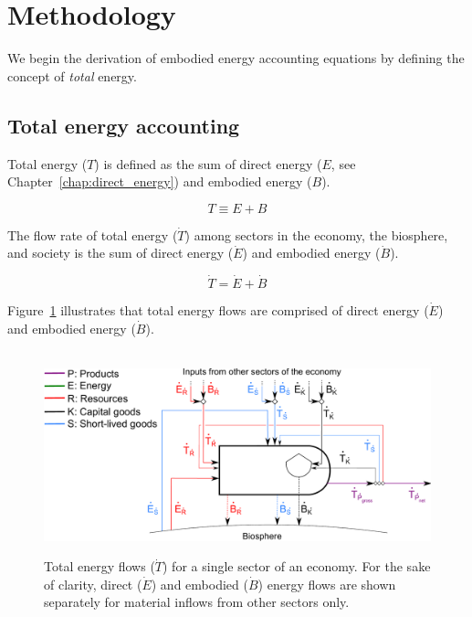 \section{Methodology}
\label{sec:embodied_methodology}

We begin the derivation of embodied energy accounting
equations by defining the concept of 
\emph{total} energy. 


\subsection{Total energy accounting}
\label{sec:total_energy_accounting}

Total energy ($T$)
is defined as the sum of 
direct energy
($E$, see Chapter~\ref{chap:direct_energy}) 
and embodied energy ($B$).

\begin{equation} \label{eq:T_def}
	T \equiv E + B
\end{equation}

The flow rate of total energy 
($\dot{T}$) among sectors in 
the economy, the biosphere, and society is the sum of
direct energy ($\dot{E}$) and embodied 
energy ($\dot{B}$).

\begin{equation} \label{eq:T_dot_def}
	\dot{T} = \dot{E} + \dot{B}
\end{equation}

\noindent Figure~\ref{fig:embodied_single_producer} illustrates
that total energy flows are comprised of
direct energy ($\dot{E}$) and embodied energy ($\dot{B}$). 

\begin{figure}[!ht]
	\centering\
	\includegraphics[width=.9\textwidth]{Part_1/Chapter_Embodied/images/PERKS_basic_unit_embodied_energy_content.pdf}
	\caption[Total energy flows for a single sector]{Total energy flows 
	($\dot{T}$) for a single sector of an economy. 
	For the sake of clarity, 
	direct ($\dot{E}$) and embodied ($\dot{B}$) energy flows
	are shown separately for material inflows from other sectors only.
}
\label{fig:embodied_single_producer}
\end{figure}

